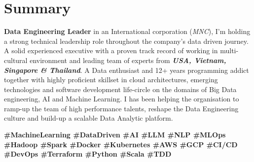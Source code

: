 \section{Summary}
  \textbf{Data Engineering Leader} in an International corporation (\emph{MNC}), I’m holding a strong technical leadership role throughout the company’s data driven journey. A solid experienced executive with a proven track record of working in multi-cultural environment and leading team of experts from \textbf{\emph{USA, Vietnam, Singapore \& Thailand}}. A Data enthusiast and 12+ years programming addict together with highly proficient skillset in cloud architectures, emerging technologies and software development life-circle on the domains of Big Data engineering, AI and Machine Learning. I has been helping the organisation to ramp-up the team of high performance talents, reshape the Data Engineering culture and build-up a scalable Data Analytic platform.
  
  \textbf{\scriptsize{
    \#MachineLearning
    \#DataDriven
    \#AI
    \#LLM
    \#NLP
    \#MLOps
    \#Hadoop
    \#Spark                                                                                                                                                                                                                                                      
    \#Docker
    \#Kubernetes
    \#AWS
    \#GCP
    \#CI/CD
    \#DevOps
    \#Terraform
    \#Python
    \#Scala
    \#TDD
  }}
